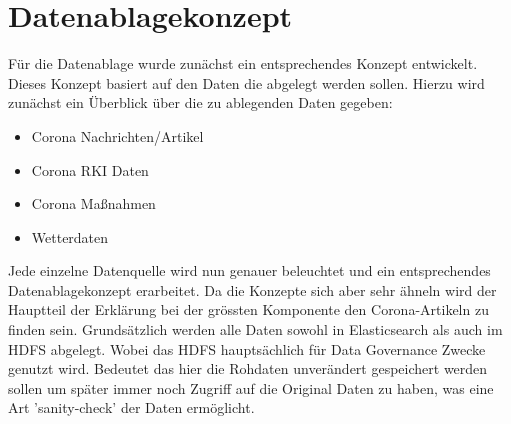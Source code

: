 \documentclass[12pt,twoside,a4paper,parskip]{scrbook}
\begin{document}
\chapter{Datenablagekonzept}
F\"ur die Datenablage wurde zun\"achst ein entsprechendes Konzept entwickelt. Dieses Konzept basiert auf den Daten die abgelegt werden sollen. Hierzu wird zun\"achst ein \"Uberblick \"uber die zu ablegenden Daten gegeben:
\begin{itemize}
	\item Corona Nachrichten/Artikel
	\item Corona RKI Daten
	\item Corona Maßnahmen
	\item Wetterdaten
\end{itemize}
Jede einzelne Datenquelle wird nun genauer beleuchtet und ein entsprechendes Datenablagekonzept erarbeitet. Da die Konzepte sich aber sehr \"ahneln wird der Hauptteil der Erkl\"arung bei der gr\"ossten Komponente den Corona-Artikeln zu finden sein. Grunds\"atzlich werden alle Daten sowohl in Elasticsearch als auch im HDFS abgelegt. Wobei das HDFS haupts\"achlich f\"ur Data Governance Zwecke genutzt wird. Bedeutet das hier die Rohdaten unver\"andert gespeichert werden sollen um sp\"ater immer noch Zugriff auf die Original Daten zu haben, was eine Art 'sanity-check' der Daten erm\"oglicht.
\end{document}
